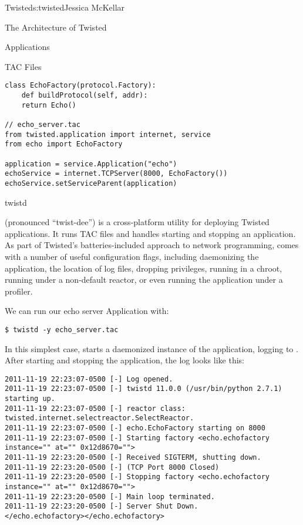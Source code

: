 \begin{aosachapter}{Twisted}{s:twisted}{Jessica McKellar}
\begin{aosasect1}{The Architecture of Twisted}
\begin{aosasect2}{Applications}
\begin{aosasect3}{TAC Files}
\begin{verbatim}
class EchoFactory(protocol.Factory):
    def buildProtocol(self, addr):
    return Echo()

// echo_server.tac
from twisted.application import internet, service
from echo import EchoFactory

application = service.Application("echo")
echoService = internet.TCPServer(8000, EchoFactory())
echoService.setServiceParent(application)
\end{verbatim}

\end{aosasect3}

\begin{aosasect3}{twistd}

 (pronounced ``twist-dee'') is a cross-platform utility for
deploying Twisted applications. It runs TAC files and handles starting and
stopping an application. As part of Twisted's batteries-included approach to
network programming,  comes with a number of useful configuration flags,
including daemonizing the application, the location of log files, dropping
privileges, running in a chroot, running under a non-default reactor, or even
running the application under a profiler.

We can run our echo server Application with:

\begin{verbatim}
$ twistd -y echo_server.tac
\end{verbatim}

In this simplest case,  starts a daemonized instance of the
application, logging to . After starting and stopping the
application, the log looks like this:

\begin{verbatim}
2011-11-19 22:23:07-0500 [-] Log opened.
2011-11-19 22:23:07-0500 [-] twistd 11.0.0 (/usr/bin/python 2.7.1) starting up.
2011-11-19 22:23:07-0500 [-] reactor class: twisted.internet.selectreactor.SelectReactor.
2011-11-19 22:23:07-0500 [-] echo.EchoFactory starting on 8000
2011-11-19 22:23:07-0500 [-] Starting factory <echo.echofactory instance="" at="" 0x12d8670="">
2011-11-19 22:23:20-0500 [-] Received SIGTERM, shutting down.
2011-11-19 22:23:20-0500 [-] (TCP Port 8000 Closed)
2011-11-19 22:23:20-0500 [-] Stopping factory <echo.echofactory instance="" at="" 0x12d8670="">
2011-11-19 22:23:20-0500 [-] Main loop terminated.
2011-11-19 22:23:20-0500 [-] Server Shut Down.
</echo.echofactory></echo.echofactory>
\end{verbatim}


\end{aosasect3}
\end{aosasect2}
\end{aosasect1}
\end{aosachapter}
